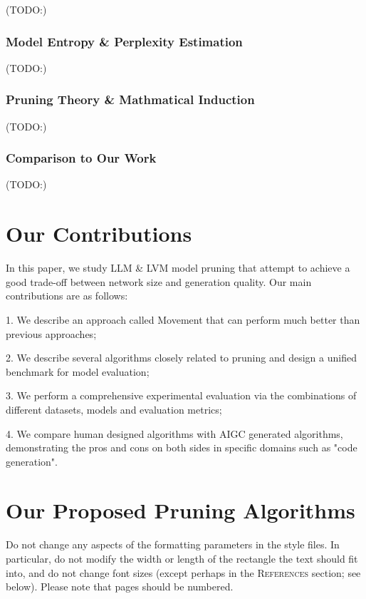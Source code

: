 \documentclass{article} %
\begin{document}
(TODO:)

\subsubsection{Model Entropy \& Perplexity Estimation}

(TODO:)

\subsubsection{Pruning Theory \& Mathmatical Induction}

(TODO:)

\subsubsection{Comparison to Our Work}

(TODO:)

\section{Our Contributions}
\label{headings}

In this paper, we study LLM \& LVM model pruning that attempt to achieve a good trade-off between network size and generation quality. Our main contributions are as follows:

1. We describe an approach called Movement that can perform much better than previous approaches;

2. We describe several algorithms closely related to pruning and design a unified benchmark for model evaluation;

3. We perform a comprehensive experimental evaluation via the combinations of different datasets, models and evaluation metrics;

4. We compare human designed algorithms with AIGC generated algorithms, demonstrating the pros and cons on both sides in specific domains such as "code generation".

\section{Our Proposed Pruning Algorithms}
\label{ours}
Do not change any aspects of the formatting parameters in the style files.
In particular, do not modify the width or length of the rectangle the text
should fit into, and do not change font sizes (except perhaps in the
\textsc{References} section; see below). Please note that pages should be
numbered.
\end{document}
